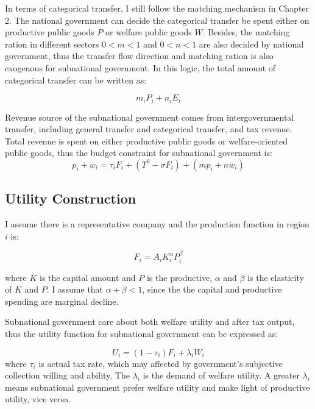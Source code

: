 In terms of categorical transfer, I still follow the matching mechanism in Chapter 2. The national government can decide the categorical transfer be spent either on productive public goods $P$ or welfare public goods $W$. Besides, the matching ration in different sectors $0<m<1$ and $0<n<1$ are also decided by national government, thus the transfer flow direction and matching ration is also exogenous for subnational government. In this logic, the total amount of categorical transfer can be written as:

\begin{equation}
    m_iP_i+n_iE_i
\end{equation}

Revenue source of the subnational government comes from intergovernmental transfer, including general transfer and categorical transfer, and tax revenue. Total revenue is spent on either productive public goods or welfare-oriented public goods, thus the budget constraint for subnational government is:
\begin{equation}
    p_i + w_i = \tau_i F_i + (T^0 - \sigma F_i) + (m p_i + n w_i)
\end{equation}

\subsection{Utility Construction}

I assume there is a representative company and the production function in region $i$ is:

\begin{equation}
    F_i=A_iK_i^{\alpha}P_i^{\beta} \label{F}
\end{equation}

where $K$ is the capital amount and $P$ is the productive,  $\alpha$ and $\beta$ is the elasticity of $K$ and $P$. I assume that $\alpha+\beta<1$, since the the capital and productive spending are marginal decline.

Subnational government care about both welfare utility and after tax output, thus the utility function for subnational government can be expressed as:

\begin{equation}
    U_i = (1 - \tau_i) F_i + \lambda_iW_i \label{U}
\end{equation}
where $\tau_i$ is actual tax rate, which may affected by government's subjective collection willing and ability. The $\lambda_i$ is the demand of welfare utility. A greater $\lambda_i$ means subnational government prefer welfare utility and make light of productive utility, vice versa.


